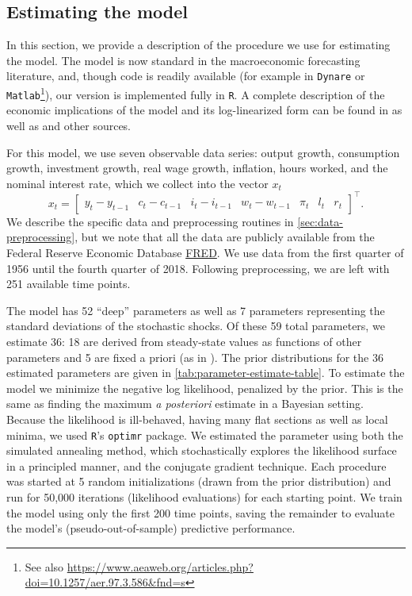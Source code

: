 \documentclass[11pt]{article}
\begin{document}
\subsection{Estimating the \citet{SmetsWouters2007} model}
\label{sec:estim-sw-model}

In this section, we provide a description of the procedure we use for
estimating the \citet{SmetsWouters2007} model. The model is now standard
in the macroeconomic forecasting literature, and, though code is readily
available (for example in \texttt{Dynare} or
\texttt{Matlab}\footnote{See also
  \url{https://www.aeaweb.org/articles.php?doi=10.1257/aer.97.3.586&fnd=s}}),
our version is implemented fully in \texttt{R}. A complete description
of the economic implications of the model and its log-linearized form
can be found in \citep{SmetsWouters2007} as well as \citet{Iskrev2009}
and other sources.

For this model, we use seven observable data series: output growth,
consumption growth, investment growth, real wage growth, inflation,
hours worked, and the nominal interest rate, which we collect into the
vector \(x_t\) \begin{equation}
  x_t = \begin{bmatrix} y_t-y_{t-1} & c_t - c_{t-1} & i_t-i_{t-1} &
    w_t-w_{t-1} & \pi_t & l_t & r_t \end{bmatrix}^\top.
\end{equation} We describe the specific data and preprocessing routines
in \autoref{sec:data-preprocessing}, but we note that all the data are
publicly available from the Federal Reserve Economic Database
\href{http://research.stlouisfed.org/fred2/}{FRED}. We use data from the
first quarter of 1956 until the fourth quarter of 2018. Following
preprocessing, we are left with 251 available time points.

The model has 52 ``deep'' parameters as well as 7 parameters
representing the standard deviations of the stochastic shocks. Of these
59 total parameters, we estimate 36: 18 are derived from steady-state
values as functions of other parameters and 5 are fixed a priori (as in
\citealt{SmetsWouters2007}). The prior distributions for the 36
estimated parameters are given in
\autoref{tab:parameter-estimate-table}. To estimate the model we
minimize the negative log likelihood, penalized by the prior. This is
the same as finding the maximum \emph{a posteriori} estimate in a
Bayesian setting. Because the likelihood is ill-behaved, having many
flat sections as well as local minima, we used \texttt{R}'s
\texttt{optimr} package. We estimated the parameter using both the
simulated annealing method, which stochastically explores the likelihood
surface in a principled manner, and the conjugate gradient technique.
Each procedure was started at 5 random initializations (drawn from the
prior distribution) and run for 50,000 iterations (likelihood
evaluations) for each starting point. We train the model using only the
first 200 time points, saving the remainder to evaluate the model's
(pseudo-out-of-sample) predictive performance.
\end{document}
